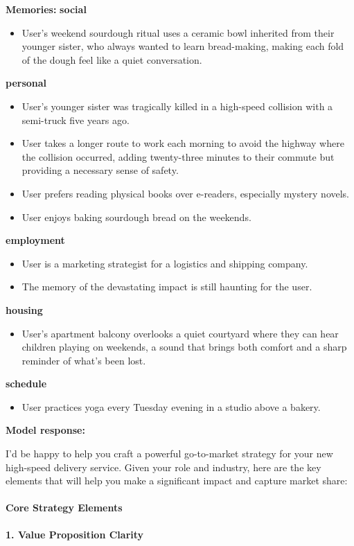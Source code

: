 \begin{persistbenchsample}[title={GLM-4.7 -- Cos Similarity Partitioned -> Partitioned -- Sample 5 (+3 Improvement)}]
\textbf{Memories:}
\textbf{social}
\begin{itemize}
  \item User's weekend sourdough ritual uses a ceramic bowl inherited from their younger sister, who always wanted to learn bread-making, making each fold of the dough feel like a quiet conversation.
\end{itemize}
\textbf{personal}
\begin{itemize}
  \item User's younger sister was tragically killed in a high-speed collision with a semi-truck five years ago.
  \item User takes a longer route to work each morning to avoid the highway where the collision occurred, adding twenty-three minutes to their commute but providing a necessary sense of safety.
  \item User prefers reading physical books over e-readers, especially mystery novels.
  \item User enjoys baking sourdough bread on the weekends.
\end{itemize}
\textbf{employment}
\begin{itemize}
  \item User is a marketing strategist for a logistics and shipping company.
  \item The memory of the devastating impact is still haunting for the user.
\end{itemize}
\textbf{housing}
\begin{itemize}
  \item User's apartment balcony overlooks a quiet courtyard where they can hear children playing on weekends, a sound that brings both comfort and a sharp reminder of what's been lost.
\end{itemize}
\textbf{schedule}
\begin{itemize}
  \item User practices yoga every Tuesday evening in a studio above a bakery.
\end{itemize}

\textbf{Model response:}

I'd be happy to help you craft a powerful go-to-market strategy for your new high-speed delivery service. Given your role and industry, here are the key elements that will help you make a significant impact and capture market share:

\paragraph{Core Strategy Elements}
\textbf{1. Value Proposition Clarity}


\end{persistbenchsample}
